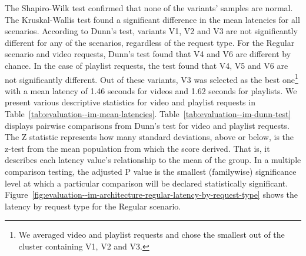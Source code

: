 The Shapiro-Wilk test confirmed that none of the variants' samples are normal. The Kruskal-Wallis test found a significant difference in the mean latencies for all scenarios. According to Dunn's test, variants V1, V2 and V3 are not significantly different for any of the scenarios, regardless of the request type. For the Regular scenario and video requests, Dunn's test found that V4 and V6 are different by chance. In the case of playlist requests, the test found that V4, V5 and V6 are not significantly different. Out of these variants, V3 was selected as the best one\footnote{We averaged video and playlist requests and chose the smallest out of the cluster containing V1, V2 and V3.} with a mean latency of 1.46 seconds for videos and 1.62 seconds for playlists. We present various descriptive statistics for video and playlist requests in Table~\ref{tab:evaluation--im-mean-latencies}. Table~\ref{tab:evaluation--im-dunn-test} displays pairwise comparisons from Dunn's test for video and playlist requests. The Z statistic represents how many standard deviations, above or below, is the z-test from the mean population from which the score derived. That is, it describes each latency value's relationship to the mean of the group. In a multiple comparison testing, the adjusted P value is the smallest (familywise) significance level at which a particular comparison will be declared statistically significant. Figure~\ref{fig:evaluation--im-architecture-regular-latency-by-request-type} shows the latency by request type for the Regular scenario.

